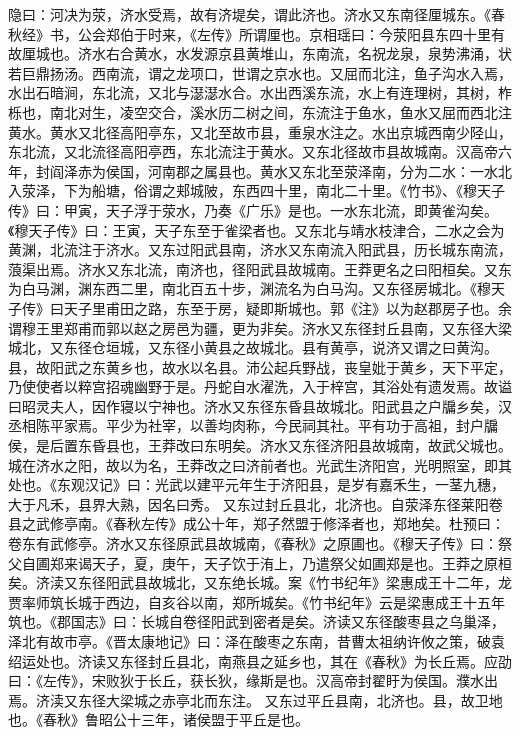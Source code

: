 \documentclass[12pt,UTF8]{ctexbook}
\begin{document}
隐曰：河决为荥，济水受焉，故有济堤矣，谓此济也。济水又东南径厘城东。《春秋经》书，公会郑伯于时来，《左传》所谓厘也。京相瑶曰：今荥阳县东四十里有故厘城也。济水右合黄水，水发源京县黄堆山，东南流，名祝龙泉，泉势沸涌，状若巨鼎扬汤。西南流，谓之龙项口，世谓之京水也。又屈而北注，鱼子沟水入焉，水出石暗涧，东北流，又北与濏濏水合。水出西溪东流，水上有连理树，其树，柞栎也，南北对生，凌空交合，溪水历二树之间，东流注于鱼水，鱼水又屈而西北注黄水。黄水又北径高阳亭东，又北至故市县，重泉水注之。水出京城西南少陉山，东北流，又北流径高阳亭西，东北流注于黄水。又东北径故市县故城南。汉高帝六年，封阎泽赤为侯国，河南郡之属县也。黄水又东北至荥泽南，分为二水：一水北入荥泽，下为船塘，俗谓之郏城陂，东西四十里，南北二十里。《竹书》、《穆天子传》曰：甲寅，天子浮于荥水，乃奏《广乐》是也。一水东北流，即黄雀沟矣。《穆天子传》曰：王寅，天子东至于雀梁者也。又东北与靖水枝津合，二水之会为黄渊，北流注于济水。又东过阳武县南，济水又东南流入阳武县，历长城东南流，蒗渠出焉。济水又东北流，南济也，径阳武县故城南。王莽更名之曰阳桓矣。又东为白马渊，渊东西二里，南北百五十步，渊流名为白马沟。又东径房城北。《穆天子传》曰天子里甫田之路，东至于房，疑即斯城也。郭《注》以为赵郡房子也。余谓穆王里郑甫而郭以赵之房邑为疆，更为非矣。济水又东径封丘县南，又东径大梁城北，又东径仓垣城，又东径小黄县之故城北。县有黄亭，说济又谓之曰黄沟。县，故阳武之东黄乡也，故水以名县。沛公起兵野战，丧皇妣于黄乡，天下平定，乃使使者以粹宫招魂幽野于是。丹蛇自水濯洗，入于梓宫，其浴处有遗发焉。故谥曰昭灵夫人，因作寝以宁神也。济水又东径东昏县故城北。阳武县之户牖乡矣，汉丞相陈平家焉。平少为社宰，以善均肉称，今民祠其社。平有功于高祖，封户牖侯，是后置东昏县也，王莽改曰东明矣。济水又东径济阳县故城南，故武父城也。城在济水之阳，故以为名，王莽改之曰济前者也。光武生济阳宫，光明照室，即其处也。《东观汉记》曰：光武以建平元年生于济阳县，是岁有嘉禾生，一茎九穗，大于凡禾，县界大熟，因名曰秀。
又东过封丘县北，北济也。自荥泽东径莱阳卷县之武修亭南。《春秋左传》成公十年，郑子然盟于修泽者也，郑地矣。杜预曰：卷东有武修亭。济水又东径原武县故城南，《春秋》之原圃也。《穆天子传》曰：祭父自圃郑来谒天子，夏，庚午，天子饮于洧上，乃遣祭父如圃郑是也。王莽之原桓矣。济渎又东径阳武县故城北，又东绝长城。案《竹书纪年》梁惠成王十二年，龙贾率师筑长城于西边，自亥谷以南，郑所城矣。《竹书纪年》云是梁惠成王十五年筑也。《郡国志》曰：长城自卷径阳武到密者是矣。济读又东径酸枣县之乌巢泽，泽北有故市亭。《晋太康地记》曰：泽在酸枣之东南，昔曹太祖纳许攸之策，破袁绍运处也。济读又东径封丘县北，南燕县之延乡也，其在《春秋》为长丘焉。应劭曰：《左传》，宋败狄于长丘，获长狄，缘斯是也。汉高帝封翟盱为侯国。濮水出焉。济渎又东径大梁城之赤亭北而东注。
又东过平丘县南，北济也。县，故卫地也。《春秋》鲁昭公十三年，诸侯盟于平丘是也。
\end{document}
